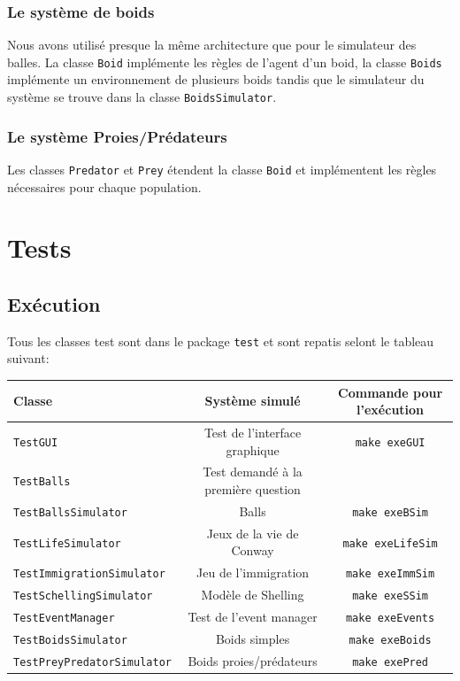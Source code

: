 \documentclass [a4paper,11pt,titlepage] {article}
\begin{document}
\subsubsection {Le système de boids}
Nous avons utilisé presque la même architecture que pour le simulateur des balles. La classe \texttt{Boid} implémente les règles de l'agent d'un boid, la classe \texttt{Boids} implémente un environnement de plusieurs boids tandis que le simulateur du système se trouve dans la classe \texttt{BoidsSimulator}.
\subsubsection {Le système Proies/Prédateurs}

Les classes \texttt{Predator} et \texttt{Prey} étendent la classe \texttt{Boid} et implémentent les règles nécessaires pour chaque population.

\section {Tests}

\subsection {Exécution}
Tous les classes test sont dans le package \texttt{test} et sont repatis selont le tableau suivant:

\begin{center}
\begin{tabular}{|l|c|c|}
  \hline
    Classe & Système simulé & Commande pour l'exécution \\
  \hline
  \texttt{TestGUI} & Test de l'interface graphique & \texttt{make exeGUI}\\
  \hline
   \texttt{TestBalls} & Test demandé à la première question & \\
  \hline
  \texttt{TestBallsSimulator} & Balls & \texttt{make exeBSim}\\
  \hline
  \texttt{TestLifeSimulator} & Jeux de la vie de Conway & \texttt{make exeLifeSim}\\
  \hline
  \texttt{TestImmigrationSimulator} & Jeu de l'immigration & \texttt{make exeImmSim}\\
  \hline
  \texttt{TestSchellingSimulator} & Modèle de Shelling & \texttt{make exeSSim}\\
  \hline
  \texttt{TestEventManager} & Test de l'event manager & \texttt{make exeEvents}\\
  \hline
  \texttt{TestBoidsSimulator} & Boids simples & \texttt{make exeBoids}\\
  \hline
  \texttt{TestPreyPredatorSimulator} & Boids proies/prédateurs  & \texttt{make exePred}\\
  \hline
  
 
\end{tabular}
\end{center}
\end{document}

